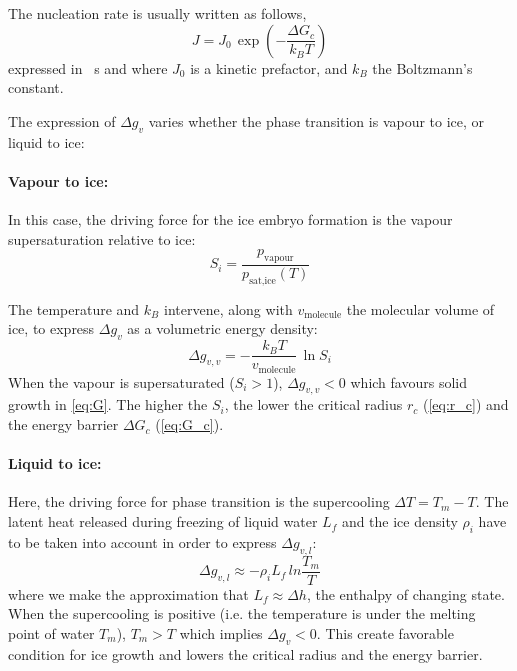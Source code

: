        The nucleation rate is usually written as follows,
       \begin{equation}
           J = J_0\, \exp\left(-\frac{\Delta G_c}{k_B T}\right)
       \end{equation}
       expressed in \si{\per\second} and where $J_0$ is a kinetic prefactor, and $k_B$ the Boltzmann's constant.

       The expression of $\Delta g_{v}$ varies whether the phase transition is vapour to ice, or liquid to ice:
       \paragraph{Vapour to ice:}
       In this case, the driving force for the ice embryo formation is the vapour supersaturation relative to ice:
       \begin{equation}
           S_i = \frac{p_{\text{vapour}}}{p_{\text{sat,ice}}(T)}
       \end{equation}
       
       The temperature and $k_B$ intervene, along with $v_{\text{molecule}}$ the molecular volume of ice, to express $\Delta g_{v}$ as a volumetric energy density:
       \begin{equation}
           \Delta g_{v,v} = - \frac{k_B T}{v_{\text{molecule}}}\, \ln S_i 
       \end{equation}
       When the vapour is supersaturated ($S_i>1$), $\Delta g_{v,v} < 0$ which favours solid growth in \cref{eq:G}. The higher the $S_i$, the lower the critical radius $r_c$ (\cref{eq:r_c}) and the energy barrier $\Delta G_c$ (\cref{eq:G_c}).

       \paragraph{Liquid to ice:}
       Here, the driving force for phase transition is the supercooling $\Delta T = T_m-T$.
       The latent heat released during freezing of liquid water $L_f$ and the ice density $\rho_i$ have to be taken into account in order to express $\Delta g_{v,l}$:
       \begin{equation}
           \Delta g_{v,l} \approx - \rho_i L_f\, ln \frac{T_m}{T}
       \end{equation}
       where we make the approximation that $L_f \approx \Delta h$, the enthalpy of changing state.
       When the supercooling is positive (i.e. the temperature is under the melting point of water $T_m$), $T_m > T$ which implies $\Delta g_v < 0$. This create favorable condition for ice growth and lowers the critical radius and the energy barrier.
       \vspace{\baselineskip}

